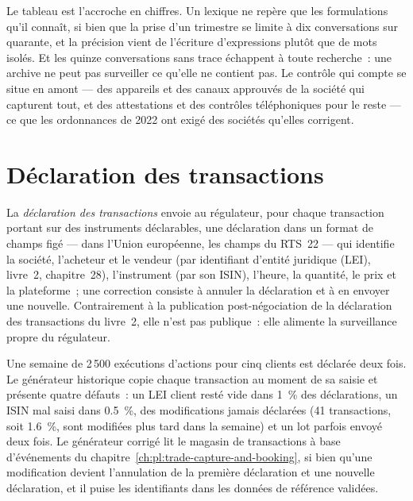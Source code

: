 Le tableau est l'accroche en chiffres. Un lexique ne repère que les formulations qu'il connaît, si bien que la prise d'un trimestre se limite à dix conversations sur quarante, et la précision
vient de l'écriture d'expressions plutôt que de mots isolés. Et les quinze conversations sans trace échappent à toute recherche~: une archive ne peut pas surveiller
ce qu'elle ne contient pas. Le contrôle qui compte se situe en amont --- des appareils et des canaux approuvés de la société qui capturent tout, et des attestations
et des contrôles téléphoniques pour le reste --- ce que les ordonnances de 2022 ont exigé des sociétés qu'elles corrigent.

\section{Déclaration des transactions}

\begin{definition}\label{def:pl:surveillance-and-compliance-technology:reporting}
La \emph{déclaration des transactions} envoie au régulateur, pour chaque transaction portant sur des instruments déclarables, une déclaration
dans un format de champs figé --- dans l'Union européenne, les champs du RTS~22 --- qui identifie la société, l'acheteur et le vendeur (par identifiant d'entité juridique (LEI),
livre~2, chapitre~28), l'instrument (par son ISIN), l'heure, la quantité, le prix et la plateforme~; une correction consiste à annuler la déclaration et à en envoyer une nouvelle.
Contrairement à la publication post-négociation de la déclaration des transactions du livre~2, elle n'est pas publique~: elle alimente la surveillance propre du régulateur.
\end{definition}

Une semaine de 2\,500 exécutions d'actions pour cinq clients est déclarée deux fois. Le générateur historique copie chaque transaction au moment de sa saisie et présente
quatre défauts~: un LEI client resté vide dans 1~\% des déclarations, un ISIN mal saisi dans 0.5~\%, des modifications jamais déclarées (41 transactions, soit 1.6~\%, sont modifiées
plus tard dans la semaine) et un lot parfois envoyé deux fois. Le générateur corrigé lit le magasin de transactions à base d'événements du chapitre~\ref{ch:pl:trade-capture-and-booking},
si bien qu'une modification devient l'annulation de la première déclaration et une nouvelle déclaration, et il puise les identifiants dans les données de référence validées.

